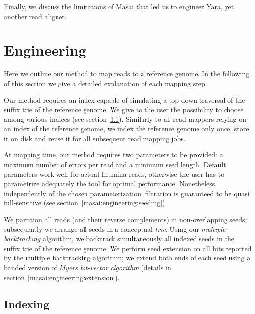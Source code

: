 Finally, we discuss the limitations of Masai that led us to engineer Yara, yet another read aligner.


\section{Engineering}

Here we outline our method to map reads to a reference genome.
In the following of this section we give a detailed explanation of each mapping step.

Our method requires an index capable of simulating a top-down traversal of the suffix trie of the reference genome.
We give to the user the possibility to choose among various indices (see section~\ref{masai:engineering:index}).
Similarly to all read mappers relying on an index of the reference genome, we index the reference genome only once, store it on disk and reuse it for all subsequent read mapping jobs.

At mapping time, our method requires two parameters to be provided: a maximum number of errors per read and a minimum seed length.
Default parameters work well for actual Illumina reads, otherwise the user has to parametrize adequately the tool for optimal performance.
Nonetheless, independently of the chosen parameterization, filtration is guaranteed to be quasi full-sensitive (see section~\ref{masai:engineering:seeding}).

We partition all reads (and their reverse complements) in non-overlapping seeds;
subsequently we arrange all seeds in a conceptual \emph{trie}.
Using our \emph{multiple backtracking} algorithm, we backtrack simultaneously all indexed seeds in the suffix trie of the reference genome.
We perform seed extension on all hits reported by the multiple backtracking algorithm;
we extend both ends of each seed using a banded version of \emph{Myers bit-vector algorithm} \citep{Myers1999} (details in section~\ref{masai:engineering:extension}).



\subsection{Indexing}
\label{masai:engineering:index}

